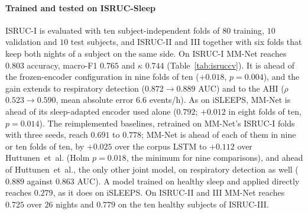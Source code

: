 \documentclass{ieeeaccess}
\begin{document}
\paragraph{Trained and tested on ISRUC-Sleep} ISRUC-I is evaluated with ten
subject-independent folds of $80$ training, $10$ validation and $10$ test subjects, and
ISRUC-II and III together with six folds that keep both nights of a subject on the same side.
On ISRUC-I MM-Net reaches $0.803$ accuracy, macro-F1 $0.765$ and $\kappa$ $0.744$
(Table~\ref{tab:isruccv}). It is ahead of the frozen-encoder configuration in nine folds of ten
($+0.018$, $p=0.004$), and the gain extends to respiratory detection
($0.872\rightarrow0.889$ AUC) and to the AHI ($\rho$ $0.523\rightarrow0.590$, mean absolute error
$6.6$ events/h). As on iSLEEPS, MM-Net is ahead of its sleep-adapted encoder used alone ($0.792$;
$+0.012$ in eight folds of ten, $p=0.014$). The reimplemented baselines, retrained on MM-Net's
ISRUC-I folds with three seeds, reach $0.691$ to $0.778$; MM-Net is ahead of each of them in nine
or ten folds of ten, by $+0.025$ over the corpus LSTM to $+0.112$ over Huttunen~et~al. (Holm
$p=0.018$, the minimum for nine comparisons), and ahead of Huttunen~et~al., the only other joint
model, on respiratory detection as well ($0.889$ against $0.863$ AUC). A model trained on healthy
sleep and applied directly reaches $0.279$, as it does on iSLEEPS. On ISRUC-II and III MM-Net
reaches $0.725$ over $26$ nights and $0.779$ on the ten healthy subjects of ISRUC-III.
\end{document}
